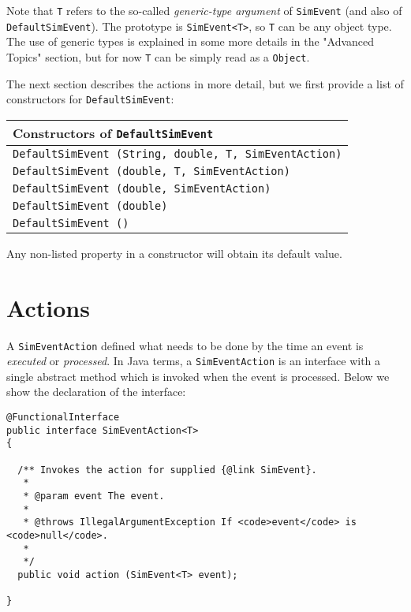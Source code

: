 \documentclass[12pt]{book}
\begin{document}
Note that \lstinline{T} refers to the so-called {\em generic-type argument\/}
  of \lstinline{SimEvent} (and also of \lstinline|DefaultSimEvent|).
The prototype is \lstinline|SimEvent<T>|, so \lstinline|T| can be any object type.
The use of generic types is explained in some more details in the "Advanced Topics" section,
  but for now \lstinline!T! can be simply read as a \lstinline{Object}.

The next section describes the actions in more detail, but we first provide a list
  of constructors for \lstinline{DefaultSimEvent}:

\begin{tabular}{|l|}
  \hline
  {\bf Constructors of \lstinline|DefaultSimEvent|} \\
  \hline
  \lstinline[basicstyle=\footnotesize]!DefaultSimEvent (String, double, T, SimEventAction)! \\
  \lstinline[basicstyle=\footnotesize]!DefaultSimEvent (double, T, SimEventAction)! \\
  \lstinline[basicstyle=\footnotesize]!DefaultSimEvent (double, SimEventAction)! \\
  \lstinline[basicstyle=\footnotesize]!DefaultSimEvent (double)! \\
  \lstinline[basicstyle=\footnotesize]!DefaultSimEvent ()! \\
  \hline
\end{tabular}

Any non-listed property in a constructor will obtain its default value.

\section{Actions}

A \lstinline{SimEventAction} defined what needs to be done by the time an event
  is {\em executed\/} or {\em processed}.
In Java terms, a \lstinline{SimEventAction} is an interface with
  a single abstract method which is invoked when the event is processed.
Below we show the declaration of the interface:
\begin{lstlisting}[basicstyle=\tiny]
@FunctionalInterface
public interface SimEventAction<T>
{

  /** Invokes the action for supplied {@link SimEvent}.
   *
   * @param event The event.
   *
   * @throws IllegalArgumentException If <code>event</code> is <code>null</code>.
   * 
   */
  public void action (SimEvent<T> event);

}
\end{lstlisting}
\end{document}

